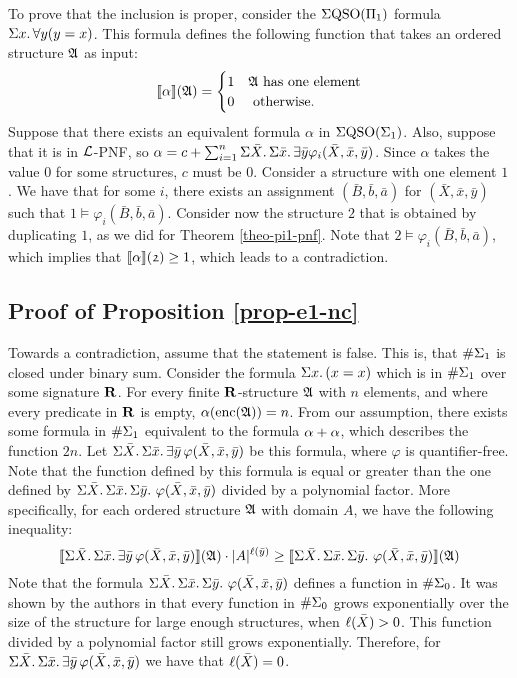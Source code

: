To prove that the inclusion is proper, consider the $\Sigma{\rm QSO}(\Pi_{1})$ formula $\Sigma{x}.\,\forall y(y = x)$. This formula defines the following function that takes an ordered structure $\mathfrak{A}$ as input:
$$
{\llbracket{}{\alpha}\rrbracket}(\mathfrak{A}) = 
\begin{cases}
1 &\mathfrak{A} \text{ has one element}\\
0 &\text{ otherwise}.
\end{cases}
$$
Suppose that there exists an equivalent formula $\alpha$ in $\Sigma{\rm QSO}(\Sigma_{1})$. Also, suppose that it is in $\L$-PNF, so $\alpha = c + \sum_{i = 1}^n\Sigma{\bar{X}}.\,\Sigma{\bar{x}}.\,\exists\bar{y}\varphi_i(\bar{X},\bar{x},\bar{y})$. Since $\alpha$ takes the value 0 for some structures, $c$ must be 0. Consider a structure with one element $\mathfrak{1}$. We have that for some $i$, there exists an assignment $(\bar{B},\bar{b},\bar{a})$ for $(\bar{X},\bar{x},\bar{y})$ such that $\mathfrak{1}\models\varphi_i(\bar{B},\bar{b},\bar{a})$. Consider now the structure $\mathfrak{2}$ that is obtained by duplicating $\mathfrak{1}$, as we did for Theorem \ref{theo-pi1-pnf}. Note that $\mathfrak{2}\models\varphi_i(\bar{B},\bar{b},\bar{a})$, which implies that ${\llbracket{}{\alpha}\rrbracket}(\mathfrak{2}) \geq 1$, which leads to a contradiction.










\subsection*{Proof of Proposition \ref{prop-e1-nc}}

Towards a contradiction, assume that the statement is false. This is, that $\#\Sigma_{1}$ is closed under binary sum. Consider the formula $\Sigma{x}.\,(x = x)$ which is in $\#\Sigma_{1}$ over some signature $\mathbf{R}$. For every finite $\mathbf{R}$-structure $\mathfrak{A}$ with $n$ elements, and where every predicate in $\mathbf{R}$ is empty, $\alpha({\rm enc}(\mathfrak{A})) = n$. From our assumption, there exists some formula in $\#\Sigma_{1}$ equivalent to the formula $\alpha + \alpha$, which describes the function $2n$. Let $\Sigma{\bar{X}}.\,\Sigma{\bar{x}}.\,\exists\bar{y}\,\varphi(\bar{X},\bar{x},\bar{y})$ be this formula, where $\varphi$ is quantifier-free. Note that the function defined by this formula is equal or greater than the one defined by $\Sigma{\bar{X}}.\,\Sigma{\bar{x}}.\,\Sigma{\bar{y}}.\,\,\varphi(\bar{X},\bar{x},\bar{y})$ divided by a polynomial factor. More specifically, for each ordered structure $\mathfrak{A}$ with domain $A$, we have the following inequality:
$$
{\llbracket{}{\Sigma{\bar{X}}.\,\Sigma{\bar{x}}.\,\exists\bar{y}\,\varphi(\bar{X},\bar{x},\bar{y})}\rrbracket}(\mathfrak{A}) \cdot \vert A \vert^{\ell(\bar{y})} \geq {\llbracket{}{\Sigma{\bar{X}}.\,\Sigma{\bar{x}}.\,\Sigma{\bar{y}}.\,\,\varphi(\bar{X},\bar{x},\bar{y})}\rrbracket}(\mathfrak{A})
$$
Note that the formula $\Sigma{\bar{X}}.\,\Sigma{\bar{x}}.\,\Sigma{\bar{y}}.\,\,\varphi(\bar{X},\bar{x},\bar{y})$ defines a function in $\#\Sigma_{0}$. It was shown by the authors in \cite{SalujaST95} that every function in $\#\Sigma_{0}$ grows exponentially over the size of the structure for large enough structures, when $\ell(\bar{X}) > 0$. This function divided by a polynomial factor still grows exponentially. Therefore, for $\Sigma{\bar{X}}.\,\Sigma{\bar{x}}.\,\exists\bar{y}\,\varphi(\bar{X},\bar{x},\bar{y})$ we have that $\ell(\bar{X}) = 0$.

